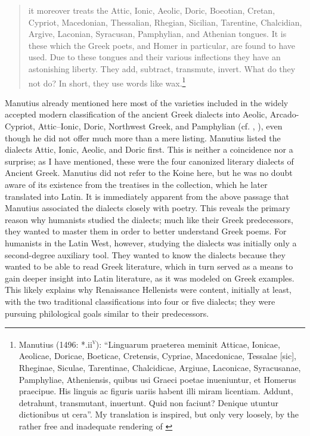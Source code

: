 {\begin{quote}
it moreover treats the Attic, Ionic, Aeolic, Doric, Boeotian, Cretan, Cypriot, Macedonian, Thessalian, Rhegian, Sicilian, Tarentine, Chalcidian, Argive, Laconian, Syracusan, Pamphylian, and Athenian tongues. It is these which the Greek poets, and Homer in particular, are found to have used. Due to these tongues and their various inflections they have an astonishing liberty. They add, subtract, transmute, invert. What do they not do? In short, they use words like wax.\footnote{Manutius (1496: *.ii\textsc{\textsuperscript{v}}): “Linguarum praeterea meminit Atticae, Ionicae, Aeolicae, Doricae, Boeticae, Cretensis, Cypriae, Macedonicae, Tessalae [sic], Rheginae, Siculae, Tarentinae, Chalcidicae, Argiuae, Laconicae, Syracusanae, Pamphyliae, Atheniensis, quibus usi Graeci poetae inueniuntur, et Homerus praecipue. His linguis ac figuris uariis habent illi miram licentiam. Addunt, detrahunt, transmutant, inuertunt. Quid non faciunt? Denique utuntur dictionibus ut cera”. My translation is inspired, but only very loosely, by the rather free and inadequate rendering of \citet[12]{Bean1958}} 
\end{quote}

Manutius already mentioned here most of the varieties included in the widely accepted modern classification of the ancient Greek dialects into Aeolic, Arcado-Cypriot, Attic–Ionic, Doric, Northwest Greek, and Pamphylian (cf. , ), even though he did not offer much more than a mere listing. Manutius listed the dialects Attic, Ionic, Aeolic, and Doric first. This is neither a coincidence nor a surprise; as I have mentioned, these were the four canonized literary dialects of Ancient Greek. Manutius did not refer to the Koine here, but he was no doubt aware of its existence from the treatises in the collection, which he later translated into Latin. It is immediately apparent from the above passage that Manutius associated the dialects closely with poetry. This reveals the primary reason why humanists studied the dialects; much like their Greek predecessors, they wanted to master them in order to better understand Greek poems. For humanists in the Latin West, however, studying the dialects was initially only a second-degree auxiliary tool. They wanted to know the dialects because they wanted to be able to read Greek literature, which in turn served as a means to gain deeper insight into Latin literature, as it was modeled on Greek examples. This likely explains why Renaissance Hellenists were content, initially at least, with the two traditional classifications into four or five dialects; they were pursuing philological goals similar to their predecessors.

}
